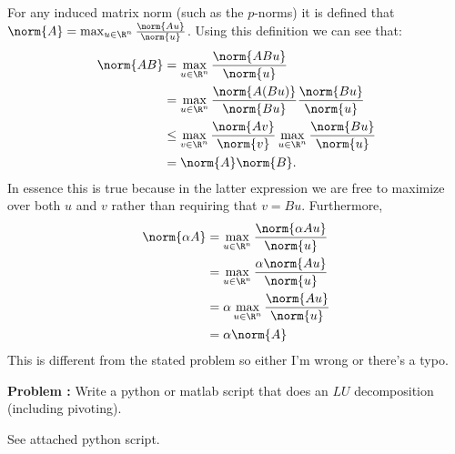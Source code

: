 \documentclass[letter, 12pt]{article}
\newcounter{probnum}
\newenvironment{problem}[1][]
   {\begin{framed} \textbf{Problem \theprobnum: #1}}
   {\end{framed}\stepcounter{probnum}}
\begin{document}
For any induced matrix norm (such as the $p$-norms) it is defined that $\norm{A} = \max_{u\in\R^n} \frac{\norm{Au}}{\norm{u}}$. Using this definition we can see that:
\begin{align*}
\norm{AB} & = \max_{u\in\R^n} \frac{\norm{ABu}}{\norm{u}} \\
& = \max_{u\in\R^n} \frac{\norm{A(Bu)}}{\norm{Bu}}\frac{\norm{Bu}}{\norm{u}} \\
& \leq \max_{v\in\R^n} \frac{\norm{Av}}{\norm{v}} \max_{u\in\R^n}\frac{\norm{Bu}}{\norm{u}} \\
& = \norm{A}\norm{B}.
\end{align*}
In essence this is true because in the latter expression we are free to maximize over both $u$ and $v$ rather than requiring that $v = Bu$. Furthermore,
\begin{align*}
\norm{\alpha A} & = \max_{u\in \R^n} \frac{\norm{\alpha A u}}{\norm{u}} \\
& = \max_{u\in \R^n} \frac{\alpha\norm{Au}}{\norm{u}} \\
& = \alpha \max_{u\in\R^n} \frac{\norm{Au}}{\norm{u}} \\
& = \alpha \norm{A}
\end{align*}
This is different from the stated problem so either I'm wrong or there's a typo.
	

\begin{problem}[]
Write a python or matlab script that does an $LU$ decomposition (including pivoting). 
\end{problem}

See attached python script.

% 
% 
\end{document}
